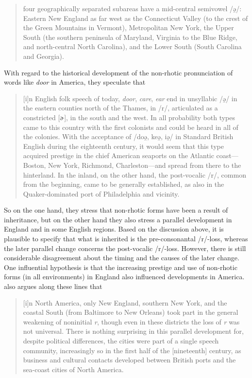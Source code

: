 \begin{quote}
{four geographically separated subareas have a mid-central semivowel /ə̯/: Eastern New England as far west as the Connecticut Valley (to the crest of the Green Mountains in Vermont), Metropolitan New York, the Upper South (the southern peninsula of Maryland, Virginia to the Blue Ridge, and north-central North Carolina), and the Lower South (South Carolina and Georgia).}
\end{quote}


With regard to the historical development of the non-rhotic pronunciation of words like \emph{door} in America, they speculate that


\begin{quote}
{[i]n English folk speech of today,} \emph{door}{,} \emph{care}{,} \emph{ear}{ end in unsyllabic /ə̯/ in the eastern counties north of the Thames, in /r/, articulated as a constricted [ɚ], in the south and the west. In all probability both types came to this country with the first colonists and could be heard in all of the colonies. With the acceptance of /doə̯, keə̯, iə̯/ in Standard British English during the eighteenth century, it would seem that this type acquired prestige in the chief American seaports on the Atlantic coast—Boston, New York, Richmond, Charleston—and spread from there to the hinterland. In the inland, on the other hand, the post-vocalic /r/, common from the beginning, came to be generally established, as also in the Quaker-dominated port of Philadelphia and vicinity.} \citep[171]{Kurath1961}
\end{quote}


So on the one hand, they stress that non-rhotic forms have been a result of inheritance, but on the other hand they also stress a parallel development in England and in some English regions. Based on the discussion above, it is plausible to specify that what is inherited is the pre-consonantal /r/-loss, whereas the later parallel change concerns the post-vocalic /r/-loss. However, there is still considerable disagreement about the timing and the causes of the later change. One influential hypothesis is that the increasing prestige and use of non-rhotic forms (in all environments) in England also influenced developments in America. \citet[105]{Bailey1996} also argues along these lines that


\begin{quote}
[i]n North America, only New England, southern New York, and the coastal South (from Baltimore to New Orleans) took part in the general weakening of noninitial \emph{r}, though even in these districts the loss of \emph{r} was not universal. There is nothing surprising in this parallel development for, despite political differences, the cities were part of a single speech community, increasingly so in the first half of the [nineteenth] century, as business and cultural contacts developed between British ports and the sea-coast cities of North America.
\end{quote}


